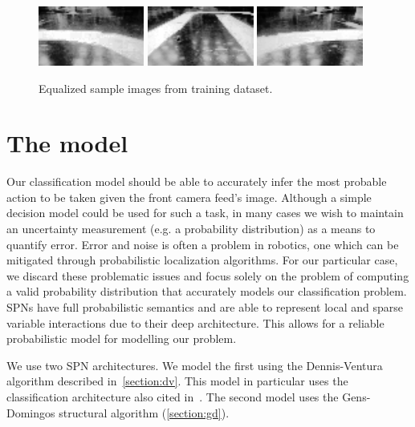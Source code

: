 \begin{figure}[h]
  \centering\includegraphics[width=0.31\textwidth]{imgs/eq_left.png}
  \includegraphics[width=0.31\textwidth]{imgs/eq_up.png}
  \includegraphics[width=0.31\textwidth]{imgs/eq_right.png}
  \caption{Equalized sample images from training dataset.\label{fig:dataset_equalized}}
\end{figure}

\section{The model}

Our classification model should be able to accurately infer the most probable action to be taken
given the front camera feed's image. Although a simple decision model could be used for such a
task, in many cases we wish to maintain an uncertainty measurement (e.g. a probability
distribution) as a means to quantify error. Error and noise is often a problem in robotics, one
which can be mitigated through probabilistic localization algorithms. For our particular case, we
discard these problematic issues and focus solely on the problem of computing a valid probability
distribution that accurately models our classification problem. SPNs have full probabilistic
semantics and are able to represent local and sparse variable interactions due to their deep
architecture. This allows for a reliable probabilistic model for modelling our problem.

We use two SPN architectures. We model the first using the Dennis-Ventura algorithm described
in~\autoref{section:dv}. This model in particular uses the classification architecture also cited
in~. The second model uses the Gens-Domingos structural algorithm
(\autoref{section:gd}).

